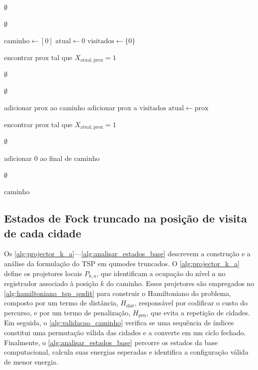 \begin{apendicesenv}
\begin{algorithm}[htbp]
\begin{algorithmic}[1]
    \State \Return $\emptyset$
\EndIf

    \State \Return $\emptyset$
\EndIf

\State $\mathrm{caminho} \gets [0]$
\State $\mathrm{atual} \gets 0$
\State $\mathrm{visitados} \gets \{0\}$

    \State encontrar $\mathrm{prox}$ tal que $X_{\mathrm{atual},\mathrm{prox}}=1$

        \State \Return $\emptyset$
    \EndIf

        \State \Return $\emptyset$
    \EndIf

    \State adicionar $\mathrm{prox}$ ao caminho
    \State adicionar $\mathrm{prox}$ a $\mathrm{visitados}$
    \State $\mathrm{atual} \gets \mathrm{prox}$
\EndFor

\State encontrar $\mathrm{prox}$ tal que $X_{\mathrm{atual},\mathrm{prox}}=1$

    \State \Return $\emptyset$
\EndIf

\State adicionar $0$ ao final de $\mathrm{caminho}$

    \State \Return $\emptyset$
\EndIf

\State \Return $\mathrm{caminho}$
\end{algorithmic}
\end{algorithm}

\subsection{Estados de Fock truncado na posição de visita de cada cidade}

Os \autoref{alg:projector_k_a}---\autoref{alg:analisar_estados_base} descrevem a construção e a análise da formulação do TSP em qumodes truncados. O \autoref{alg:projector_k_a} define os projetores locais $P_{k,a}$, que identificam a ocupação do nível $a$ no registrador associado à posição $k$ do caminho. Esses projetores são empregados no \autoref{alg:hamiltoniano_tsp_qudit} para construir o Hamiltoniano do problema, composto por um termo de distância, $H_{\mathrm{dist}}$, responsável por codificar o custo do percurso, e por um termo de penalização, $H_{\mathrm{pen}}$, que evita a repetição de cidades. Em seguida, o \autoref{alg:validacao_caminho} verifica se uma sequência de índices constitui uma permutação válida das cidades e a converte em um ciclo fechado. Finalmente, o \autoref{alg:analisar_estados_base} percorre os estados da base computacional, calcula suas energias esperadas e identifica a configuração válida de menor energia.


\end{apendicesenv}

